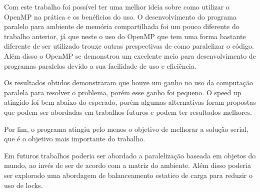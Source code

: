 \documentclass{article}
\begin{document}
Com este trabalho foi possível ter uma melhor ideia sobre como utilizar o OpenMP na prática e os benéficios do uso. O desenvolvimento do programa paralelo para ambiente de memória compartilhada foi um pouco diferente do trabalho anterior, já que neste o uso do OpenMP que tem uma forma bastante diferente de ser utilizado trouxe outras prespectivas de como paralelizar o código. Além disso o OpenMP se demonstrou um excelente meio para desenvolvimento de programas paralelos devido a sua facilidade de uso e eficiência.


Os resultados obtidos demonstraram que houve um ganho no uso da computação paralela para resolver o problema, porém esse ganho foi pequeno. O speed up atingido foi bem abaixo do esperado, porém algumas alternativas foram propostas que podem ser abordadas em trabalhos futuros e podem ter resultados melhores.

Por fim, o programa atingiu pelo menos o objetivo de melhorar a solução serial, que é o objetivo mais importante do trabalho.

Em futuros trabalhos poderia ser abordado a paralelização baseada em objetos do mundo, ao invés de ser de acordo com a matriz do ambiente. Além disso poderia ser explorado uma abordagem de balanceamento estatico de carga para reduzir o uso de locks.





%
%
\end{document}
